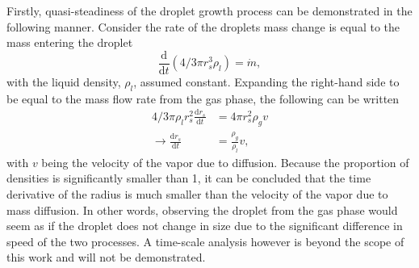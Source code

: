 \documentclass[12pt]{article}
\numberwithin{equation}{section}
\begin{document}
Firstly, quasi-steadiness of the droplet growth process can be demonstrated in the following manner. Consider the rate of the droplets mass change is equal to the mass entering the droplet
\begin{equation}
    \frac{\mathrm{d}}{\mathrm{d}t}(4/3 \pi r_{s}^{3}\rho_{l})=\dot {m},
\end{equation}
with the liquid density, $\rho_{l}$, assumed constant. Expanding the right-hand side to be equal to the mass flow rate from the gas phase, the following can be written
\begin{equation}
    \begin{aligned}
        4/3\pi \rho_{l}r_{s}^{2}\frac{\mathrm{d}r_{s}}{\mathrm{d}t}&=4\pi r_{s}^{2}\rho_{g}v \\
        \rightarrow \frac{\mathrm{d}r_{s}}{\mathrm{d}t}&=\frac{\rho_{g}}{\rho_{l}}v,
    \end{aligned}
\end{equation}
with $v$ being the velocity of the vapor due to diffusion. Because the proportion of densities is significantly smaller than 1, it can be concluded that the time derivative of the radius is much smaller than the velocity of the vapor due to mass diffusion. In other words, observing the droplet from the gas phase would seem as if the droplet does not change in size due to the significant difference in speed of the two processes. A time-scale analysis however is beyond the scope of this work and will not be demonstrated. 
\end{document}

